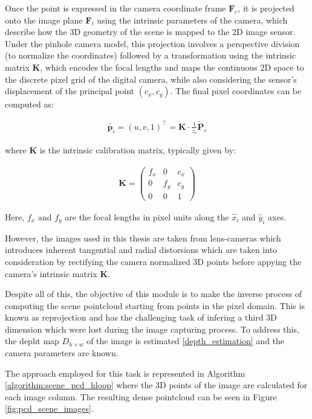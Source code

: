 Once the point is expressed in the camera coordinate frame $\mathbf{F}_c$, it is projected onto the image plane $\mathbf{F}_i$ using the intrinsic parameters of the camera, which describe how the 3D geometry of the scene is mapped to the 2D image sensor. Under the pinhole camera model, this projection involves a perspective division (to normalize the coordinates) followed by a transformation using the intrinsic matrix $\mathbf{K}$, which encodes the focal lengths and maps the continuous 2D space to the discrete pixel grid of the digital camera, while also considering the sensor's displacement of the principal point $(c_x, c_y)$. The final pixel coordinates can be computed as:

\begin{align}
    \tilde{\mathbf{p}_i}
    = \left(u, v, 1\right)^\top
    = \mathbf{K} \cdot \frac{1}{z_c} \tilde{\mathbf{P}}_c
\end{align}

where $\mathbf{K}$ is the intrinsic calibration matrix, typically given by:

\begin{align}
    \mathbf{K} =
    \begin{pmatrix}
        f_x & 0 & c_x \\
        0 & f_y & c_y \\
        0 & 0 & 1
    \end{pmatrix}
\end{align}

Here, $f_x$ and $f_y$ are the focal lengths in pixel units along the $\hat{x}_i$ and $\hat{y}_i$ axes.

However, the images used in this thesis are taken from lens-cameras which introduces inherent tangential and radial distorsions which are taken into consideration by rectifying the camera normalized 3D points before appying the camera's intrinsic matrix $\mathbf{K}$.

Despite all of this, the objective of this module is to make the inverse process of computing the scene pointcloud starting from points in the pixel domain. This is known as reprojection and has the challenging task of infering a third 3D dimension which were lost during the image capturing process. To address this, the depht map $D_{h \times w}$ of the image is estimated \ref{depth_estimation} and the camera parameters are known. 

The approach employed for this task is represented in Algorithm \ref{algorithm:scene_pcd_hloop} where the 3D points of the image are calculated for each image column. The resulting dense pointcloud can be seen in Figure \ref{fig:pcd_scene_images}.

